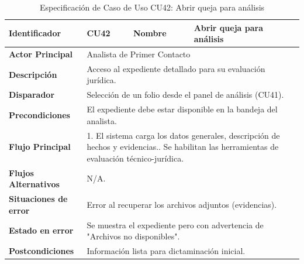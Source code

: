 \vspace{0.8cm}

\begingroup
\setlength{\parskip}{0pt}
\begin{longtable}{|p{3.5cm}|p{2cm}|p{2.5cm}|p{7cm}|}
\caption{Especificación de Caso de Uso CU42: Abrir queja para análisis}
\label{tab:cu42} \\
\hline
\textbf{Identificador} & CU42 & \textbf{Nombre} & Abrir queja para análisis \\ \hline
\textbf{Actor Principal} & \multicolumn{3}{p{11.5cm}|}{Analista de Primer Contacto} \\ \hline
\textbf{Descripción} & \multicolumn{3}{p{11.5cm}|}{Acceso al expediente detallado para su evaluación jurídica.} \\ \hline
\textbf{Disparador} & \multicolumn{3}{p{11.5cm}|}{Selección de un folio desde el panel de análisis (CU41).} \\ \hline
\textbf{Precondiciones} & \multicolumn{3}{p{11.5cm}|}{El expediente debe estar disponible en la bandeja del analista.} \\ \hline
\textbf{Flujo Principal} & \multicolumn{3}{p{11.5cm}|}{1. El sistema carga los datos generales, descripción de hechos y evidencias.\newline 2. Se habilitan las herramientas de evaluación técnico-jurídica.} \\ \hline
\textbf{Flujos Alternativos} & \multicolumn{3}{p{11.5cm}|}{N/A.} \\ \hline
\textbf{Situaciones de error} & \multicolumn{3}{p{11.5cm}|}{Error al recuperar los archivos adjuntos (evidencias).} \\ \hline
\textbf{Estado en error} & \multicolumn{3}{p{11.5cm}|}{Se muestra el expediente pero con advertencia de "Archivos no disponibles".} \\ \hline
\textbf{Postcondiciones} & \multicolumn{3}{p{11.5cm}|}{Información lista para dictaminación inicial.} \\ \hline
\end{longtable}
\endgroup

\vspace{0.8cm}

